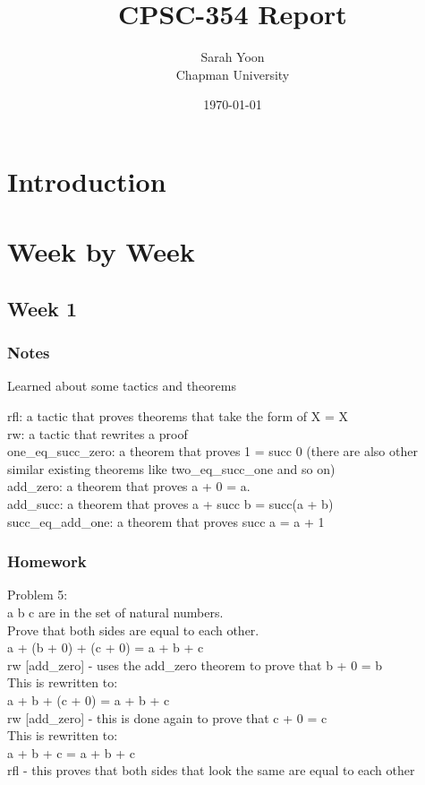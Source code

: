 \documentclass{article}
\title{CPSC-354 Report}
\author{Sarah Yoon  \\ Chapman University}
\date{\today}
\theoremstyle{theorem}
\theoremstyle{definition}
\theoremstyle{remark}
\begin{document}
\maketitle

\begin{abstract}

\end{abstract}

\setcounter{tocdepth}{3}
\tableofcontents

\section{Introduction}\label{intro}

\section{Week by Week}\label{homework}

\subsection{Week 1}

\subsubsection*{Notes}
Learned about some tactics and theorems

rfl: a tactic that proves theorems that take the form of X = X \\
rw: a tactic that rewrites a proof\\
one\_eq\_succ\_zero: a theorem that proves 1 = succ 0 (there are also other similar existing theorems like two\_eq\_succ\_one and so on)\\
add\_zero: a theorem that proves a + 0 = a.\\
add\_succ: a theorem that proves a + succ b = succ(a + b)\\
succ\_eq\_add\_one: a theorem that proves succ a = a + 1\\

\subsubsection*{Homework}
Problem 5: \\
a b c are in the set of natural numbers. \\
Prove that both sides are equal to each other. \\
a + (b + 0) + (c + 0) = a + b + c \\
rw [add\_zero] - uses the add\_zero theorem to prove that b + 0 = b \\
This is rewritten to: \\
a + b + (c + 0) = a + b + c \\
rw [add\_zero] - this is done again to prove that c + 0 = c \\ 
This is rewritten to: \\
a + b + c = a + b + c \\
rfl - this proves that both sides that look the same are equal to each other \\
\end{document}
